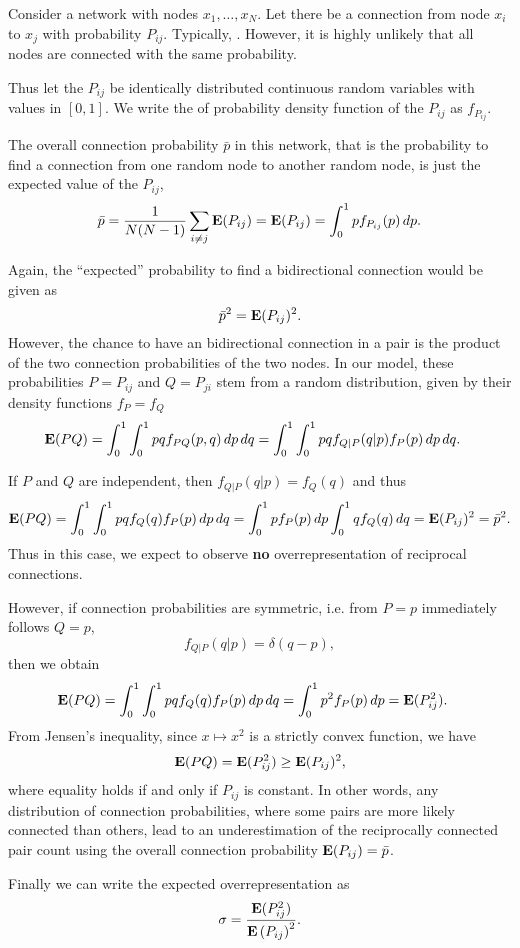 
Consider a network with nodes $x_1,\dots,x_{N}$. Let there be a connection from node $x_i$ to $x_j$ with probability $P_{ij}$. Typically, . However, it is highly unlikely that all nodes are connected with the same probability. 

Thus let the $P_{ij}$ be identically distributed continuous random variables with values in $[0,1]$. We write the of probability density function of the $P_{ij}$ as $f_{P_{ij}}$.





The overall connection probability $\bar{p}$ in this network, that is the probability to find a connection from one random node to another random node, is just the expected value of the $P_{ij}$,
\[
\bar{p} = \frac{1}{N(N-1)} \sum_{i \neq j} \operatorname{\mathbf{E}}(P_{ij}) = \operatorname{\mathbf{E}}(P_{ij}) = \int_0^1 p f_{P_{ij}}(p)\, dp.
\]

Again, the \enquote{expected} probability to find a bidirectional connection would be given as
\[
\bar{p}^2 = \operatorname{\mathbf{E}}(P_{ij})^2.
\]
However, the chance to have an bidirectional connection in a pair is the product of the two connection probabilities of the two nodes. In our model, these probabilities $P=P_{ij}$ and $Q=P_{ji}$ stem from a random distribution, given by their density functions $f_P = f_Q$
%
\begin{align*}
\operatorname{\mathbf{E}}(PQ) & = \int_0^1 \int_0^1 pq f_{PQ}(p,q) \,dp\,dq = \int_0^1 \int_0^1 pq f_{Q|P}(q|p) f_{P}(p) \,dp\,dq.
\end{align*}

If $P$ and $Q$ are independent, then $f_{Q|P}(q|p) = f_Q(q)$ and thus
\[
\operatorname{\mathbf{E}}(PQ) = \int_0^1 \int_0^1 pq f_{Q}(q) f_{P}(p) \,dp\,dq = \int_0^1 p  f_{P}(p) \,dp \int_0^1  q f_{Q}(q) \,dq =  \operatorname{\mathbf{E}}(P_{ij})^2 = \bar{p}^2.
\]
Thus in this case, we expect to observe \textbf{no} overrepresentation of reciprocal connections.

However, if connection probabilities are symmetric, i.e. from $P = p$ immediately follows $Q=p$,
\[
f_{Q|P}(q|p) = \delta(q-p),
\]
then we obtain
%
\begin{align*}
\operatorname{\mathbf{E}}(PQ) & = \int_0^1 \int_0^1 pq f_{Q}(q) f_{P}(p) \,dp\,dq = \int_0^1 p^2  f_{P}(p) \,dp =  \operatorname{\mathbf{E}}(P_{ij}^2).
\end{align*}
%
From Jensen's inequality, since $x \mapsto x^2$ is a strictly convex function, we have
%
\[
\operatorname{\mathbf{E}}(PQ) = \operatorname{\mathbf{E}}(P_{ij}^2) \geq \operatorname{\mathbf{E}}(P_{ij})^2,
\]
where equality holds if and only if $P_{ij}$ is constant. In other words, any distribution of connection probabilities, where some pairs are more likely connected than others, lead to an underestimation of the reciprocally connected pair count using the overall connection probability $\operatorname{\mathbf{E}}(P_{ij}) = \bar{p}$.

Finally we can write the expected overrepresentation as
\[
\sigma = \frac{\operatorname{\mathbf{E}}(P_{ij}^2)}{{\operatorname{\mathbf{E}}\left(P_{ij}\right)}^2}.
\]


